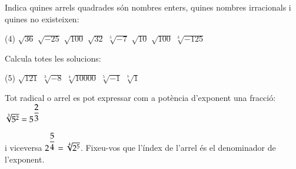 \begin{mylist}
  \exer \mental Indica quines arrels quadrades són nombres enters, quines nombres irracionals i quines no existeixen:
 \begin{tasks}(4)
 	\task  $\sqrt{36} $ \task  $\sqrt{-25} $  \task  $\sqrt{100} $ \task  $\sqrt{32} $ \task  $\sqrt[5]{-7} $  \task  $\sqrt{10} $            \task  $\sqrt{100}$ \task $\sqrt[3]{-125}$
 \end{tasks}

 \exer  Calcula totes les solucions:  
 \begin{tasks}(5)
 	\task  $\sqrt{121} $   \task  $\sqrt[{3}]{-8} $  \task  $\sqrt[{4}]{10000} $  \task  $\sqrt[{5}]{-1} $      \task  $\sqrt[{7}]{1} $
 \end{tasks}
\answers{[$\pm 11$, --2, $\pm 10$, --1, 1]}
 
\end{mylist}

 \begin{theorybox}
  Tot radical o arrel es pot expressar com a potència d'exponent una fracció:
  $\sqrt[3]{5^2} = 5^{\ofrac{2}{3}}$
  
  i viceversa $2^{\ofrac{5}{4}}=\sqrt[4]{2^5}$. Fixeu-vos que l'índex de l'arrel és el denominador de l'exponent.
 \end{theorybox}
 
